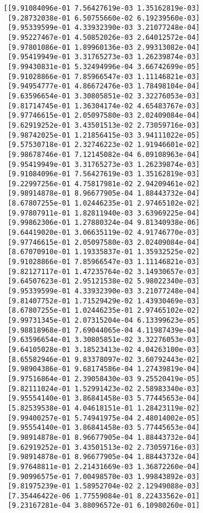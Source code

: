 \documentclass[11pt]{article}
\begin{document}
    \begin{Verbatim}[commandchars=\\\{\}]
[[9.91084096e-01 7.56427619e-03 1.35162819e-03]
 [9.28732038e-01 6.50755660e-02 6.19239560e-03]
 [9.95339599e-01 4.33932390e-03 3.21077248e-04]
 [9.95227467e-01 4.50852026e-03 2.64012572e-04]
 [9.97801086e-01 1.89960136e-03 2.99313082e-04]
 [9.95419949e-01 3.31765273e-03 1.26239874e-03]
 [9.99430831e-01 5.32494996e-04 3.66742699e-05]
 [9.91028866e-01 7.85966547e-03 1.11146821e-03]
 [9.94954777e-01 4.86672476e-03 1.78498104e-04]
 [9.63596654e-01 3.30805851e-02 3.32276053e-03]
 [9.81714745e-01 1.36304174e-02 4.65483767e-03]
 [9.97746615e-01 2.05097580e-03 2.02409084e-04]
 [9.62919252e-01 3.43501513e-02 2.73059716e-03]
 [9.98742025e-01 1.21856415e-03 3.94111022e-05]
 [9.57530718e-01 2.32746223e-02 1.91946601e-02]
 [9.98678746e-01 7.12145082e-04 6.09108963e-04]
 [9.95419949e-01 3.31765273e-03 1.26239874e-03]
 [9.91084096e-01 7.56427619e-03 1.35162819e-03]
 [9.22997256e-01 4.75817981e-02 2.94209461e-02]
 [9.98914878e-01 8.96677905e-04 1.88443732e-04]
 [8.67807255e-01 1.02446235e-01 2.97465102e-02]
 [9.97807911e-01 1.82811940e-03 3.63969225e-04]
 [9.99862306e-01 1.27880324e-04 9.81340938e-06]
 [9.64419020e-01 3.06635119e-02 4.91746770e-03]
 [9.97746615e-01 2.05097580e-03 2.02409084e-04]
 [8.67070910e-01 1.19335837e-01 1.35932525e-02]
 [9.91028866e-01 7.85966547e-03 1.11146821e-03]
 [9.82127117e-01 1.47235764e-02 3.14930657e-03]
 [9.64507623e-01 2.95121538e-02 5.98022340e-03]
 [9.95339599e-01 4.33932390e-03 3.21077248e-04]
 [9.81407752e-01 1.71529429e-02 1.43930469e-03]
 [8.67807255e-01 1.02446235e-01 2.97465102e-02]
 [9.99731345e-01 2.07315204e-04 6.13399623e-05]
 [9.98818968e-01 7.69044065e-04 4.11987439e-04]
 [9.63596654e-01 3.30805851e-02 3.32276053e-03]
 [9.64105028e-01 3.18523413e-02 4.04263100e-03]
 [8.65582946e-01 9.83378097e-02 3.60792443e-02]
 [9.98904386e-01 9.68174586e-04 1.27439819e-04]
 [9.97516864e-01 2.39058430e-03 9.25520419e-05]
 [9.82111024e-01 1.52991423e-02 2.58983340e-03]
 [9.95554140e-01 3.86841458e-03 5.77445653e-04]
 [5.82539538e-01 4.04618151e-01 1.28423119e-02]
 [9.99400257e-01 5.74941975e-04 2.48014002e-05]
 [9.95554140e-01 3.86841458e-03 5.77445653e-04]
 [9.98914878e-01 8.96677905e-04 1.88443732e-04]
 [9.62919252e-01 3.43501513e-02 2.73059716e-03]
 [9.98914878e-01 8.96677905e-04 1.88443732e-04]
 [9.97648811e-01 2.21431669e-03 1.36872260e-04]
 [9.90996575e-01 7.00498570e-03 1.99843892e-03]
 [9.81975239e-01 1.58952704e-02 2.12949088e-03]
 [7.35446422e-06 1.77559084e-01 8.22433562e-01]
 [9.23167281e-04 3.88096572e-01 6.10980260e-01]

\end{Verbatim}
\end{document}
